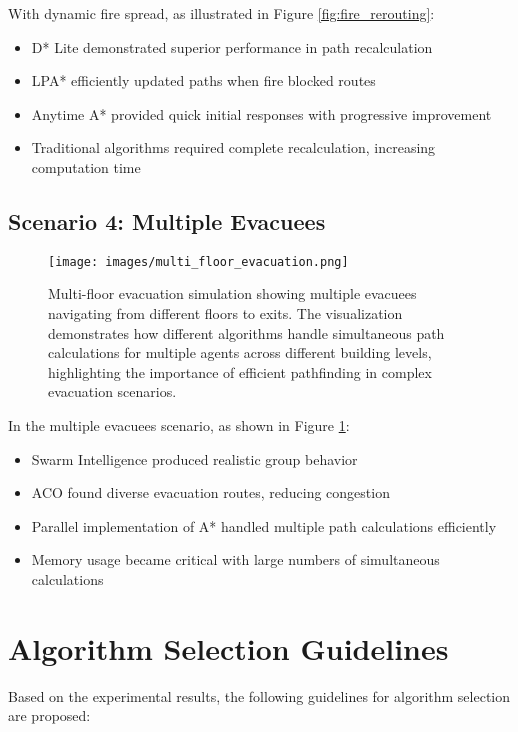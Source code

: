 \documentclass[11pt,a4paper]{report}
\begin{document}
With dynamic fire spread, as illustrated in Figure \ref{fig:fire_rerouting}:
\begin{itemize}
    \item D* Lite demonstrated superior performance in path recalculation
    \item LPA* efficiently updated paths when fire blocked routes
    \item Anytime A* provided quick initial responses with progressive improvement
    \item Traditional algorithms required complete recalculation, increasing computation time
\end{itemize}

\subsection{Scenario 4: Multiple Evacuees}
\begin{figure}[H]
    \centering
    \texttt{[image: images/multi\_floor\_evacuation.png]}
    \caption{Multi-floor evacuation simulation showing multiple evacuees navigating from different floors to exits. The visualization demonstrates how different algorithms handle simultaneous path calculations for multiple agents across different building levels, highlighting the importance of efficient pathfinding in complex evacuation scenarios.}
    \label{fig:multi_floor_evacuation}
\end{figure}

In the multiple evacuees scenario, as shown in Figure \ref{fig:multi_floor_evacuation}:
\begin{itemize}
    \item Swarm Intelligence produced realistic group behavior
    \item ACO found diverse evacuation routes, reducing congestion
    \item Parallel implementation of A* handled multiple path calculations efficiently
    \item Memory usage became critical with large numbers of simultaneous calculations
\end{itemize}

\section{Algorithm Selection Guidelines}
Based on the experimental results, the following guidelines for algorithm selection are proposed:
\end{document}
